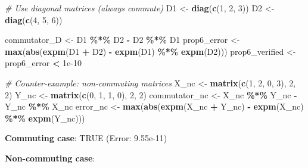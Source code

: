 \documentclass[
]{book}
\newenvironment{Shaded}{\begin{snugshade}}{\end{snugshade}}
\newcommand{\CommentTok}[1]{\textcolor[rgb]{0.56,0.35,0.01}{\textit{#1}}}
\newcommand{\DecValTok}[1]{\textcolor[rgb]{0.00,0.00,0.81}{#1}}
\newcommand{\FloatTok}[1]{\textcolor[rgb]{0.00,0.00,0.81}{#1}}
\newcommand{\FunctionTok}[1]{\textcolor[rgb]{0.13,0.29,0.53}{\textbf{#1}}}
\newcommand{\NormalTok}[1]{#1}
\newcommand{\OtherTok}[1]{\textcolor[rgb]{0.56,0.35,0.01}{#1}}
\newcommand{\SpecialCharTok}[1]{\textcolor[rgb]{0.81,0.36,0.00}{\textbf{#1}}}
\theoremstyle{definition}
\theoremstyle{definition}
\theoremstyle{definition}
\theoremstyle{definition}
\theoremstyle{remark}
\begin{document}
\begin{Shaded}
\begin{Highlighting}[]
\CommentTok{\# Use diagonal matrices (always commute)}
\NormalTok{D1 }\OtherTok{\textless{}{-}} \FunctionTok{diag}\NormalTok{(}\FunctionTok{c}\NormalTok{(}\DecValTok{1}\NormalTok{, }\DecValTok{2}\NormalTok{, }\DecValTok{3}\NormalTok{))}
\NormalTok{D2 }\OtherTok{\textless{}{-}} \FunctionTok{diag}\NormalTok{(}\FunctionTok{c}\NormalTok{(}\DecValTok{4}\NormalTok{, }\DecValTok{5}\NormalTok{, }\DecValTok{6}\NormalTok{))}

\NormalTok{commutator\_D }\OtherTok{\textless{}{-}}\NormalTok{ D1 }\SpecialCharTok{\%*\%}\NormalTok{ D2 }\SpecialCharTok{{-}}\NormalTok{ D2 }\SpecialCharTok{\%*\%}\NormalTok{ D1}
\NormalTok{prop6\_error }\OtherTok{\textless{}{-}} \FunctionTok{max}\NormalTok{(}\FunctionTok{abs}\NormalTok{(}\FunctionTok{expm}\NormalTok{(D1 }\SpecialCharTok{+}\NormalTok{ D2) }\SpecialCharTok{{-}} \FunctionTok{expm}\NormalTok{(D1) }\SpecialCharTok{\%*\%} \FunctionTok{expm}\NormalTok{(D2)))}
\NormalTok{prop6\_verified }\OtherTok{\textless{}{-}}\NormalTok{ prop6\_error }\SpecialCharTok{\textless{}} \FloatTok{1e{-}10}

\CommentTok{\# Counter{-}example: non{-}commuting matrices}
\NormalTok{X\_nc }\OtherTok{\textless{}{-}} \FunctionTok{matrix}\NormalTok{(}\FunctionTok{c}\NormalTok{(}\DecValTok{1}\NormalTok{, }\DecValTok{2}\NormalTok{, }\DecValTok{0}\NormalTok{, }\DecValTok{3}\NormalTok{), }\DecValTok{2}\NormalTok{, }\DecValTok{2}\NormalTok{)}
\NormalTok{Y\_nc }\OtherTok{\textless{}{-}} \FunctionTok{matrix}\NormalTok{(}\FunctionTok{c}\NormalTok{(}\DecValTok{0}\NormalTok{, }\DecValTok{1}\NormalTok{, }\DecValTok{1}\NormalTok{, }\DecValTok{0}\NormalTok{), }\DecValTok{2}\NormalTok{, }\DecValTok{2}\NormalTok{)}
\NormalTok{commutator\_nc }\OtherTok{\textless{}{-}}\NormalTok{ X\_nc }\SpecialCharTok{\%*\%}\NormalTok{ Y\_nc }\SpecialCharTok{{-}}\NormalTok{ Y\_nc }\SpecialCharTok{\%*\%}\NormalTok{ X\_nc}
\NormalTok{error\_nc }\OtherTok{\textless{}{-}} \FunctionTok{max}\NormalTok{(}\FunctionTok{abs}\NormalTok{(}\FunctionTok{expm}\NormalTok{(X\_nc }\SpecialCharTok{+}\NormalTok{ Y\_nc) }\SpecialCharTok{{-}} \FunctionTok{expm}\NormalTok{(X\_nc) }\SpecialCharTok{\%*\%} \FunctionTok{expm}\NormalTok{(Y\_nc)))}
\end{Highlighting}
\end{Shaded}

\textbf{Commuting case}: TRUE (Error: 9.55e-11)

\textbf{Non-commuting case}:
\end{document}

